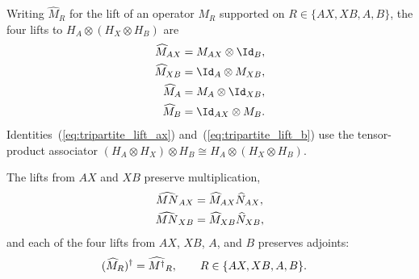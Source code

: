 \begin{definition}
    \label{def:tripartite_local_lifts}
    \leanok
    Writing $\widehat M_R$ for the lift of an operator $M_R$ supported on
    $R\in\{AX,XB,A,B\}$, the four lifts to
    $H_A\otimes(H_X\otimes H_B)$ are
    \begin{align}
        \widehat M_{AX} & =M_{AX}\otimes\Id_B, \label{eq:tripartite_lift_ax} \\
        \widehat M_{XB} & =\Id_A\otimes M_{XB}, \notag                       \\
        \widehat M_A    & =M_A\otimes\Id_{XB}, \notag                        \\
        \widehat M_B    & =\Id_{AX}\otimes M_B. \label{eq:tripartite_lift_b}
    \end{align}
    Identities~(\ref{eq:tripartite_lift_ax}) and~(\ref{eq:tripartite_lift_b}) use the tensor-product associator
    $(H_A\otimes H_X)\otimes H_B\cong H_A\otimes(H_X\otimes H_B)$.
\end{definition}

\begin{lemma}
    \label{lem:tripartite_local_lift_algebra}
    \leanok
    The lifts from $AX$ and $XB$ preserve multiplication,
    \begin{align}
        \widehat{MN}_{AX} & =\widehat M_{AX}\widehat N_{AX},
        \notag                                               \\
        \widehat{MN}_{XB} & =\widehat M_{XB}\widehat N_{XB},
        \notag
    \end{align}
    and each of the four lifts from $AX$, $XB$, $A$, and $B$ preserves
    adjoints:
    \begin{align}
        (\widehat M_R)^\dagger
         & =\widehat{M^\dagger}_R,
        \qquad R\in\{AX,XB,A,B\}.
        \notag
    \end{align}
\end{lemma}

